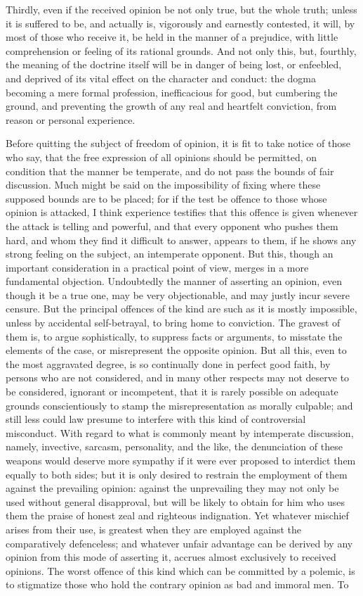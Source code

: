 \documentclass[12pt]{report}
\begin{document}
Thirdly, even if the received opinion be not only true, but the whole truth; unless it is suffered to be, and actually is, vigorously and earnestly contested, it will, by most of those who receive it, be held in the manner of a prejudice, with little comprehension or feeling of its rational grounds. And not only this, but, fourthly, the meaning of the doctrine itself will be in danger of being lost, or enfeebled, and deprived of its vital effect on the character and conduct: the dogma becoming a mere formal profession, inefficacious for good, but cumbering the ground, and preventing the growth of any real and heartfelt conviction, from reason or personal experience.

Before quitting the subject of freedom of opinion, it is fit to take notice of those who say, that the free expression of all opinions should be permitted, on condition that the manner be temperate, and do not pass the bounds of fair discussion. Much might be said on the impossibility of fixing where these supposed bounds are to be placed; for if the test be offence to those whose opinion is attacked, I think experience testifies that this offence is given whenever the attack is telling and powerful, and that every opponent who pushes them hard, and whom they find it difficult to answer, appears to them, if he shows any strong feeling on the subject, an intemperate opponent. But this, though an important consideration in a practical point of view, merges in a more fundamental objection. Undoubtedly the manner of asserting an opinion, even though it be a true one, may be very objectionable, and may justly incur severe censure. But the principal offences of the kind are such as it is mostly impossible, unless by accidental self-betrayal, to bring home to conviction. The gravest of them is, to argue sophistically, to suppress facts or arguments, to misstate the elements of the case, or misrepresent the opposite opinion. But all this, even to the most aggravated degree, is so continually done in perfect good faith, by persons who are not considered, and in many other respects may not deserve to be considered, ignorant or incompetent, that it is rarely possible on adequate grounds conscientiously to stamp the misrepresentation as morally culpable; and still less could law presume to interfere with this kind of controversial misconduct. With regard to what is commonly meant by intemperate discussion, namely, invective, sarcasm, personality, and the like, the denunciation of these weapons would deserve more sympathy if it were ever proposed to interdict them equally to both sides; but it is only desired to restrain the employment of them against the prevailing opinion: against the unprevailing they may not only be used without general disapproval, but will be likely to obtain for him who uses them the praise of honest zeal and righteous indignation. Yet whatever mischief arises from their use, is greatest when they are employed against the comparatively defenceless; and whatever unfair advantage can be derived by any opinion from this mode of asserting it, accrues almost exclusively to received opinions. The worst offence of this kind which can be committed by a polemic, is to stigmatize those who hold the contrary opinion as bad and immoral men. To 
\end{document}
